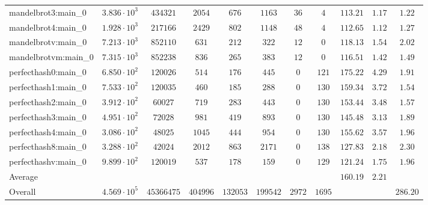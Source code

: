 \begin{tabular}{|l|c|c|c|c|c|c|c|c|c|c|}
mandelbrot3:main\_0            & $ 3.836 \cdot 10^{3} $ & $ 434321   $ & $ 2054   $ & $ 676    $ & $ 1163   $ & $ 36   $ & $ 4    $ & $ 113.21      $ & $ 1.17    $ & $ 1.22    $ \\
mandelbrot4:main\_0            & $ 1.928 \cdot 10^{3} $ & $ 217166   $ & $ 2429   $ & $ 802    $ & $ 1148   $ & $ 48   $ & $ 4    $ & $ 112.65      $ & $ 1.12    $ & $ 1.27    $ \\
mandelbrotv:main\_0            & $ 7.213 \cdot 10^{3} $ & $ 852110   $ & $ 631    $ & $ 212    $ & $ 322    $ & $ 12   $ & $ 0    $ & $ 118.13      $ & $ 1.54    $ & $ 2.02    $ \\
mandelbrotvm:main\_0           & $ 7.315 \cdot 10^{3} $ & $ 852238   $ & $ 836    $ & $ 265    $ & $ 383    $ & $ 12   $ & $ 0    $ & $ 116.51      $ & $ 1.42    $ & $ 1.49    $ \\
perfecthash0:main\_0           & $ 6.850 \cdot 10^{2} $ & $ 120026   $ & $ 514    $ & $ 176    $ & $ 445    $ & $ 0    $ & $ 121  $ & $ 175.22      $ & $ 4.29    $ & $ 1.91    $ \\
perfecthash1:main\_0           & $ 7.533 \cdot 10^{2} $ & $ 120035   $ & $ 460    $ & $ 185    $ & $ 288    $ & $ 0    $ & $ 130  $ & $ 159.34      $ & $ 3.72    $ & $ 1.54    $ \\
perfecthash2:main\_0           & $ 3.912 \cdot 10^{2} $ & $ 60027    $ & $ 719    $ & $ 283    $ & $ 443    $ & $ 0    $ & $ 130  $ & $ 153.44      $ & $ 3.48    $ & $ 1.57    $ \\
perfecthash3:main\_0           & $ 4.951 \cdot 10^{2} $ & $ 72028    $ & $ 981    $ & $ 419    $ & $ 893    $ & $ 0    $ & $ 130  $ & $ 145.48      $ & $ 3.13    $ & $ 1.89    $ \\
perfecthash4:main\_0           & $ 3.086 \cdot 10^{2} $ & $ 48025    $ & $ 1045   $ & $ 444    $ & $ 954    $ & $ 0    $ & $ 130  $ & $ 155.62      $ & $ 3.57    $ & $ 1.96    $ \\
perfecthash8:main\_0           & $ 3.288 \cdot 10^{2} $ & $ 42024    $ & $ 2012   $ & $ 863    $ & $ 2171   $ & $ 0    $ & $ 138  $ & $ 127.83      $ & $ 2.18    $ & $ 2.30    $ \\
perfecthashv:main\_0           & $ 9.899 \cdot 10^{2} $ & $ 120019   $ & $ 537    $ & $ 178    $ & $ 159    $ & $ 0    $ & $ 129  $ & $ 121.24      $ & $ 1.75    $ & $ 1.96    $ \\
\hline
Average                        & $                    $ & $          $ & $        $ & $        $ & $        $ & $      $ & $      $ & $ 160.19      $ & $ 2.21    $ & $         $ \\
\hline
Overall                        & $ 4.569 \cdot 10^{5} $ & $ 45366475 $ & $ 404996 $ & $ 132053 $ & $ 199542 $ & $ 2972 $ & $ 1695 $ & $             $ & $         $ & $ 286.20  $ \\
\hline
\end{tabular}
